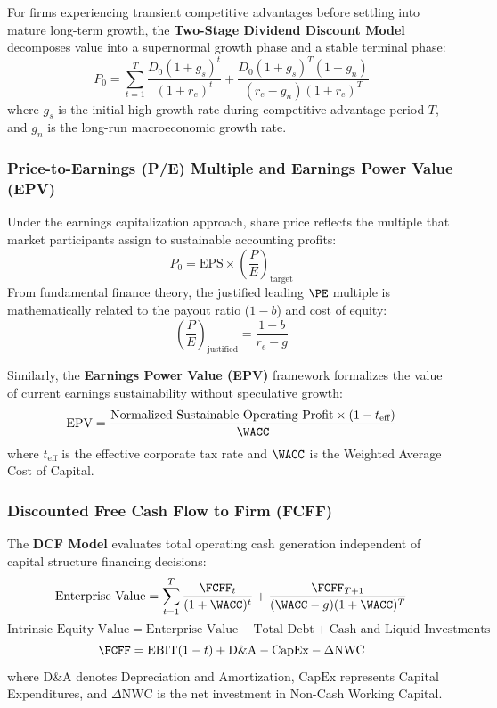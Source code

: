 For firms experiencing transient competitive advantages before settling into mature long-term growth, the \textbf{Two-Stage Dividend Discount Model} decomposes value into a supernormal growth phase and a stable terminal phase:
\begin{equation}
    P_0 = \sum_{t=1}^{T} \frac{D_0 (1 + g_s)^t}{(1 + r_e)^t} + \frac{D_0 (1 + g_s)^T (1 + g_n)}{(r_e - g_n)(1 + r_e)^T}
\end{equation}
where $g_s$ is the initial high growth rate during competitive advantage period $T$, and $g_n$ is the long-run macroeconomic growth rate.

\subsubsection{Price-to-Earnings (P/E) Multiple and Earnings Power Value (EPV)}
Under the earnings capitalization approach, share price reflects the multiple that market participants assign to sustainable accounting profits:
\begin{equation}
    P_0 = \text{EPS} \times \left(\frac{P}{E}\right)_{\text{target}}
\end{equation}
From fundamental finance theory, the justified leading $\PE$ multiple is mathematically related to the payout ratio ($1 - b$) and cost of equity:
\begin{equation}
    \left(\frac{P}{E}\right)_{\text{justified}} = \frac{1 - b}{r_e - g}
\end{equation}

Similarly, the \textbf{Earnings Power Value (EPV)} framework formalizes the value of current earnings sustainability without speculative growth:
\begin{equation}
    \text{EPV} = \frac{\text{Normalized Sustainable Operating Profit} \times (1 - t_{\text{eff}})}{\WACC}
\end{equation}
where $t_{\text{eff}}$ is the effective corporate tax rate and $\WACC$ is the Weighted Average Cost of Capital.

\subsubsection{Discounted Free Cash Flow to Firm (FCFF)}
The \textbf{DCF Model} evaluates total operating cash generation independent of capital structure financing decisions:
\begin{equation}
    \text{Enterprise Value} = \sum_{t=1}^{T} \frac{\FCFF_t}{(1 + \WACC)^t} + \frac{\FCFF_{T+1}}{(\WACC - g)(1 + \WACC)^T}
\end{equation}
\begin{equation}
    \text{Intrinsic Equity Value} = \text{Enterprise Value} - \text{Total Debt} + \text{Cash and Liquid Investments}
\end{equation}
\begin{equation}
    \FCFF = \text{EBIT}(1 - t) + \text{D\&A} - \text{CapEx} - \Delta\text{NWC}
\end{equation}
where $\text{D\&A}$ denotes Depreciation and Amortization, $\text{CapEx}$ represents Capital Expenditures, and $\Delta\text{NWC}$ is the net investment in Non-Cash Working Capital.

